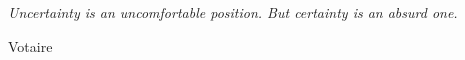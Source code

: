 \chapter*{}
\renewcommand{\epigraphsize}{\large}
\setlength{\epigraphwidth}{0.8\textwidth}
\renewcommand{\epigraphflush}{center}
\renewcommand{\epigraphrule}{0pt}
\epigraph{\textit{Uncertainty is an uncomfortable position. But certainty is an absurd one.}}{Votaire}
